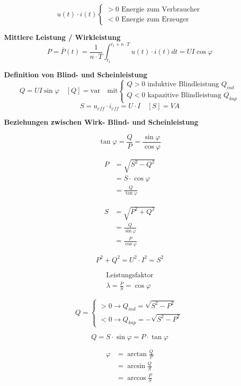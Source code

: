 \vspace{0mm}

\[u\left(t\right)\cdot i\left(t\right)
\begin{cases}
>0\text{ Energie zum Verbraucher} \\
<0\text{ Energie zum Erzeuger}
\end{cases}\]

\textbf{Mittlere Leistung / Wirkleistung}
\[P = \overline{P}\left(t\right) = \frac{1}{n \cdot T} \int_{t_1}^{t_1 + n \cdot T} u\left(t\right) \cdot i\left(t\right) dt = UI\cos\varphi\]

\textbf{Definition von Blind- und Scheinleistung}
\[Q = UI\sin\varphi \quad \left[Q\right] = \text{var} \quad \text{mit}
\begin{cases}
Q>0\text{ induktive Blindleistung } Q_{ind} \\ 
Q<0\text{ kapazitive Blindleistung } Q_{kap}
\end{cases}
\]
\[S = u_{eff} \cdot i_{eff} = U \cdot I \quad \left[S\right] = VA\]

\textbf{Beziehungen zwischen Wirk- Blind- und Scheinleistung}

\begin{center}
\end{center}

\begin{multicols}{2}
\[\tan\varphi=\frac{Q}{P}=\frac{\sin\varphi}{\cos\varphi}\]

\begin{align*}
P&=\sqrt{S^2-Q^2} \\
 &=S\cdot\cos\varphi \\
 &=\frac{Q}{\tan\varphi}
\end{align*}

\begin{align*}
S&=\sqrt{P^2+Q^2} \\
 &=\frac{Q}{\sin\varphi} \\
 &=\frac{P}{\cos\varphi}
\end{align*}

\[P^2+Q^2=U^2\cdot I^2=S^2\]

\begin{align*}
\text{Leistungsfaktor} \\
\lambda = \frac{P}{S} = \cos\varphi
\end{align*}

\[Q =
\begin{cases}
>0 \rightarrow Q_{ind} = \sqrt{S^2-P^2} \\
<0 \rightarrow Q_{kap} = -\sqrt{S^2-P^2}
\end{cases}\]

\[Q=S\cdot\sin\varphi=P\cdot\tan\varphi\]

\begin{align*}
\varphi&=\arctan\frac{Q}{P} \\ 
       &=\arcsin\frac{Q}{S} \\
       &=\arccos\frac{P}{S}
\end{align*}

\end{multicols}

